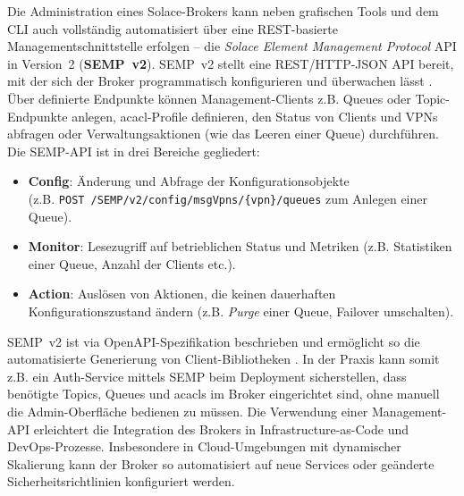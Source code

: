 Die Administration eines Solace-Brokers kann neben grafischen Tools und dem CLI auch vollständig automatisiert über eine REST-basierte Managementschnittstelle erfolgen – die \textit{Solace Element Management Protocol} API in Version 2 (\textbf{SEMP v2}). SEMP v2 stellt eine REST/HTTP-JSON API bereit, mit der sich der Broker programmatisch konfigurieren und überwachen lässt \cite{SolaceSEMP}. Über definierte Endpunkte können Management-Clients z.B. Queues oder Topic-Endpunkte anlegen, ac{acl}-Profile definieren, den Status von Clients und VPNs abfragen oder Verwaltungsaktionen (wie das Leeren einer Queue) durchführen. Die SEMP-API ist in drei Bereiche gegliedert: \begin{itemize}\setlength\itemsep{0pt} \item \textbf{Config}: Änderung und Abfrage der Konfigurationsobjekte \\(z.B. \verb|POST /SEMP/v2/config/msgVpns/{vpn}/queues| zum Anlegen einer Queue). \item \textbf{Monitor}: Lesezugriff auf betrieblichen Status und Metriken (z.B. Statistiken einer Queue, Anzahl der Clients etc.). \item \textbf{Action}: Auslösen von Aktionen, die keinen dauerhaften Konfigurationszustand ändern (z.B. \textit{Purge} einer Queue, Failover umschalten). \end{itemize} SEMP v2 ist via OpenAPI-Spezifikation beschrieben und ermöglicht so die automatisierte Generierung von Client-Bibliotheken \cite{SolaceSEMP}. In der Praxis kann somit z.B. ein Auth-Service mittels SEMP beim Deployment sicherstellen, dass benötigte Topics, Queues und ac{acl}s im Broker eingerichtet sind, ohne manuell die Admin-Oberfläche bedienen zu müssen. Die Verwendung einer Management-API erleichtert die Integration des Brokers in Infrastructure-as-Code und DevOps-Prozesse. Insbesondere in Cloud-Umgebungen mit dynamischer Skalierung kann der Broker so automatisiert auf neue Services oder geänderte Sicherheitsrichtlinien konfiguriert werden.

